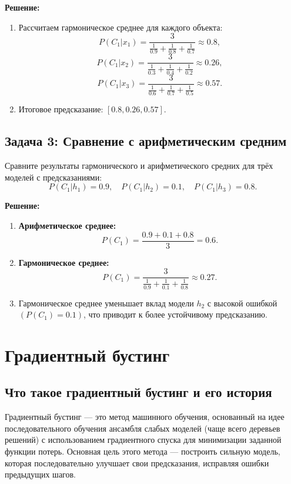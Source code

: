 \textbf{Решение:}
\begin{enumerate}
    \item Рассчитаем гармоническое среднее для каждого объекта:
          \[
              P(C_1 | x_1) = \frac{3}{\frac{1}{0.9} + \frac{1}{0.8} + \frac{1}{0.7}} \approx 0.8,
          \]
          \[
              P(C_1 | x_2) = \frac{3}{\frac{1}{0.3} + \frac{1}{0.4} + \frac{1}{0.2}} \approx 0.26,
          \]
          \[
              P(C_1 | x_3) = \frac{3}{\frac{1}{0.6} + \frac{1}{0.7} + \frac{1}{0.5}} \approx 0.57.
          \]
    \item Итоговое предсказание: \( [0.8, 0.26, 0.57] \).
\end{enumerate}

\subsection*{Задача 3: Сравнение с арифметическим средним}

Сравните результаты гармонического и арифметического средних для трёх моделей с предсказаниями:
\[
    P(C_1 | h_1) = 0.9, \quad P(C_1 | h_2) = 0.1, \quad P(C_1 | h_3) = 0.8.
\]

\textbf{Решение:}
\begin{enumerate}
    \item \textbf{Арифметическое среднее:}
          \[
              P(C_1) = \frac{0.9 + 0.1 + 0.8}{3} = 0.6.
          \]
    \item \textbf{Гармоническое среднее:}
          \[
              P(C_1) = \frac{3}{\frac{1}{0.9} + \frac{1}{0.1} + \frac{1}{0.8}} \approx 0.27.
          \]
    \item Гармоническое среднее уменьшает вклад модели \( h_2 \) с высокой ошибкой \( (P(C_1) = 0.1) \), что приводит к более устойчивому предсказанию.
\end{enumerate}

\section{Градиентный бустинг}

\subsection{Что такое градиентный бустинг и его история}

Градиентный бустинг — это метод машинного обучения, основанный на идее последовательного обучения ансамбля слабых моделей (чаще всего деревьев решений) с использованием градиентного спуска для минимизации заданной функции потерь. Основная цель этого метода — построить сильную модель, которая последовательно улучшает свои предсказания, исправляя ошибки предыдущих шагов.

